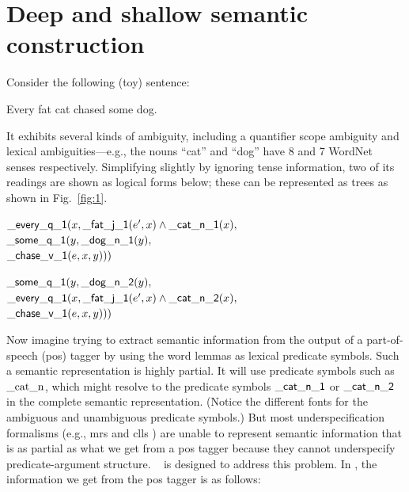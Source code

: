 \section{Deep and shallow semantic construction}
\label{sec:motivation}

Consider the
following (toy) sentence:
\begin{examples}
\label{ex:cat}
  \item Every fat cat chased some dog.
\end{examples}
It exhibits several kinds of ambiguity, including a quantifier scope
ambiguity and lexical
ambiguities---e.g., the nouns ``cat'' and ``dog'' have 8 and 7
WordNet senses respectively.  Simplifying slightly by ignoring tense
information, two of its readings are shown as logical forms below;
these can be represented as trees as shown in Fig.~\ref{fig:1}.

\begin{examples}
\item $\mathsf{\_every\_q\_1}(x, \mathsf{\_fat\_j\_1}(e',x) \wedge
    \mathsf{\_cat\_n\_1}(x),$\\
\hspace*{0.1in} $\mathsf{\_some\_q\_1}(y, \mathsf{\_dog\_n\_1}(y),$\\
\hspace*{0.2in}$\mathsf{\_chase\_v\_1}(e,x,y)))$
\label{ex:fat-cat-1}
\item $\mathsf{\_some\_q\_1}(y, \mathsf{\_dog\_n\_2}(y),$\\
\hspace*{0.1in}$\mathsf{\_every\_q\_1}(x, \mathsf{\_fat\_j\_1}(e',x) \wedge
    \mathsf{\_cat\_n\_2}(x), $\\
\hspace*{0.2in}$\mathsf{\_chase\_v\_1}(e,x,y)))$
\label{ex:fat-cat-2}
\end{examples}

Now imagine trying to extract semantic information from the output of
a part-of-speech ({\sc pos}) tagger by using the word lemmas as
lexical predicate symbols.  Such a semantic representation is highly
partial.  It will use predicate symbols such as $\mathrm{\_cat\_n}$,
which might resolve to the predicate symbols $\mathsf{\_cat\_n\_1}$ or
$\mathsf{\_cat\_n\_2}$ in the complete semantic representation.  (Notice
the different fonts for the ambiguous and unambiguous predicate
symbols.)  But most underspecification formalisms (e.g., {\sc mrs}
\cite{copestake:etal:2005} and {\sc clls} \cite{egg:etal:2001}) are
unable to represent semantic information that is as partial as what we
get from a {\sc pos} tagger because they cannot underspecify
predicate-argument structure.  \rmrs\ \cite{copestake:2007a} is 
designed to address this problem.  In \rmrs, the
information we get from the {\sc pos} tagger is as follows:

